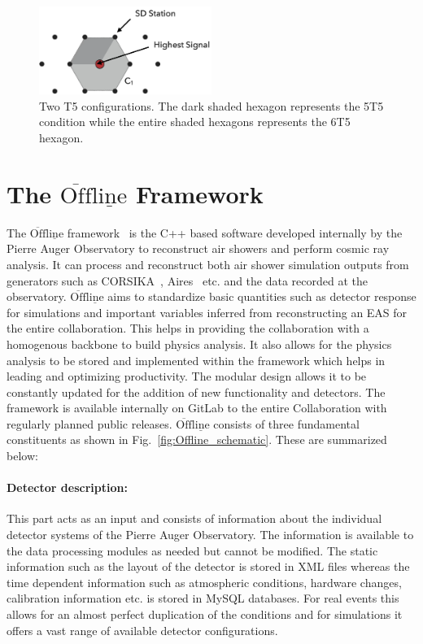 \begin{figure}[t!]
  \centering
  \includegraphics[width=0.5\textwidth]{thesis_figures/Setup/T5_modes.png}
  \caption{Two T5 configurations. The dark shaded hexagon represents the 5T5 condition while the entire shaded hexagons represents the 6T5 hexagon.}
  \label{fig:T5_config}
\end{figure}

\section{The \texorpdfstring{$\overline{\text{Off}} \underline{\text{line}}$}{} Framework}
\label{sec:Offline}

The $\mathrm{\overline{Off} \underline{line}}$ framework~\cite{Argiro:2007qg,PierreAuger:2023cqe} is the C++ based software developed internally by the Pierre Auger Observatory to reconstruct air showers and perform cosmic ray analysis. It can process and reconstruct both air shower simulation outputs from generators such as CORSIKA~\cite{Heck:1998vt}, Aires~\cite{Sciutto:1999jh} etc. and the data recorded at the observatory. $\mathrm{\overline{Off} \underline{line}}$ aims to standardize basic quantities such as detector response for simulations and important variables inferred from reconstructing an EAS for the entire collaboration. This helps in providing the collaboration with a homogenous backbone to build physics analysis. It also allows for the physics analysis to be stored and implemented within the framework which helps in leading and optimizing productivity. The modular design allows it to be constantly updated for the addition of new functionality and detectors. The framework is available internally on GitLab to the entire Collaboration with regularly planned public releases. $\mathrm{\overline{Off} \underline{line}}$ consists of three fundamental constituents as shown in Fig.~\ref{fig:Offline_schematic}. These are summarized below:



\paragraph*{Detector description:} 
This part acts as an input and consists of information about the individual detector systems of the Pierre Auger Observatory. The information is available to the data processing modules as needed but cannot be modified. The static information such as the layout of the detector is stored in XML files whereas the time dependent information such as atmospheric conditions, hardware changes, calibration information etc. is stored in MySQL databases. For real events this allows for an almost perfect duplication of the conditions and for simulations it offers a vast range of available detector configurations.  

